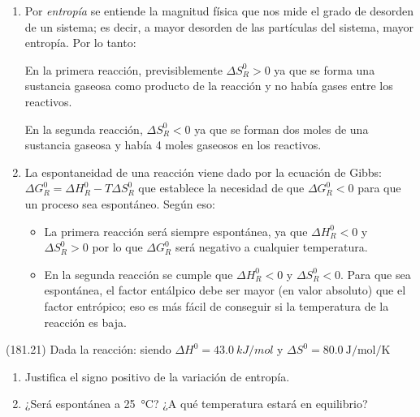 \documentclass[10pt,a5paper,twoside]{article}
\begin{document}
  \begin{solution}
    \begin{enumerate}
      \item Por \textit{entropía} se entiende la magnitud física que nos mide el grado de desorden de un sistema; es decir, a mayor desorden de las partículas del sistema, mayor entropía. Por lo tanto:

      En la primera reacción, previsiblemente \( \Delta S^0_R > 0 \) ya que se forma una sustancia gaseosa como producto de la reacción y no había gases entre los reactivos.

      En la segunda reacción, \( \Delta S^0_R < 0 \) ya que se forman dos moles de una sustancia gaseosa y había 4 moles gaseosos en los reactivos.

      \item La espontaneidad de una reacción viene dado por la ecuación de Gibbs: \( \Delta G^0_R = \Delta H^0_R - T\Delta S^0_R \) que establece la necesidad de que \( \Delta G^0_R < 0 \) para que un proceso sea espontáneo. Según eso:

      \begin{itemize}
        \item La primera reacción será siempre espontánea, ya que \( \Delta H^0_R < 0 \) y \( \Delta S^0_R > 0 \) por lo que \( \Delta G^0_R \) será negativo a cualquier temperatura.
        \item En la segunda reacción se cumple que \( \Delta H^0_R < 0 \) y \( \Delta S^0_R < 0 \). Para que sea espontánea, el factor entálpico debe ser mayor (en valor absoluto) que el factor entrópico; eso es más fácil de conseguir si la temperatura de la reacción es baja.
      \end{itemize}
    \end{enumerate}
  \end{solution}




  \begin{exercise}[
      tags    = {},
      topics  = {química, termodinámica, termoquímica},
      source  = {FQ 1B MGH 2016, p181, e21},
    ]
    (181.21) Dada la reacción: 
    siendo \( \Delta H^0 = \SI{43.0}{kJ/mol} \) y \( \Delta S^0 = \SI{80.0}{\joule\per\mole\per\kelvin} \)
    \begin{enumerate}
      \item Justifica el signo positivo de la variación de entropía.
      \item ¿Será espontánea a \SI{25}{\celsius}? ¿A qué temperatura estará en
      equilibrio?
    \end{enumerate}
  \end{exercise}
\end{document}

